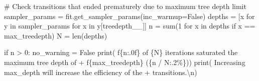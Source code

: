 \documentclass[
  letterpaper,
  DIV=11,
  numbers=noendperiod]{scrartcl}
\newenvironment{Shaded}{\begin{snugshade}}{\end{snugshade}}
\newcommand{\BuiltInTok}[1]{\textcolor[rgb]{0.00,0.23,0.31}{#1}}
\newcommand{\CharTok}[1]{\textcolor[rgb]{0.13,0.47,0.30}{#1}}
\newcommand{\CommentTok}[1]{\textcolor[rgb]{0.37,0.37,0.37}{#1}}
\newcommand{\ControlFlowTok}[1]{\textcolor[rgb]{0.00,0.23,0.31}{#1}}
\newcommand{\DecValTok}[1]{\textcolor[rgb]{0.68,0.00,0.00}{#1}}
\newcommand{\KeywordTok}[1]{\textcolor[rgb]{0.00,0.23,0.31}{#1}}
\newcommand{\NormalTok}[1]{\textcolor[rgb]{0.00,0.23,0.31}{#1}}
\newcommand{\OperatorTok}[1]{\textcolor[rgb]{0.37,0.37,0.37}{#1}}
\newcommand{\SpecialCharTok}[1]{\textcolor[rgb]{0.37,0.37,0.37}{#1}}
\newcommand{\SpecialStringTok}[1]{\textcolor[rgb]{0.13,0.47,0.30}{#1}}
\newcommand{\StringTok}[1]{\textcolor[rgb]{0.13,0.47,0.30}{#1}}
\newcommand{\VariableTok}[1]{\textcolor[rgb]{0.07,0.07,0.07}{#1}}
\begin{document}
\begin{Shaded}
\begin{Highlighting}[]
  \CommentTok{\# Check transitions that ended prematurely due to maximum tree depth limit}
\NormalTok{  sampler\_params }\OperatorTok{=}\NormalTok{ fit.get\_sampler\_params(inc\_warmup}\OperatorTok{=}\VariableTok{False}\NormalTok{)}
\NormalTok{  depths }\OperatorTok{=}\NormalTok{ [x }\ControlFlowTok{for}\NormalTok{ y }\KeywordTok{in}\NormalTok{ sampler\_params }\ControlFlowTok{for}\NormalTok{ x }\KeywordTok{in}\NormalTok{ y[}\StringTok{\textquotesingle{}treedepth\_\_\textquotesingle{}}\NormalTok{]]}
\NormalTok{  n }\OperatorTok{=} \BuiltInTok{sum}\NormalTok{(}\DecValTok{1} \ControlFlowTok{for}\NormalTok{ x }\KeywordTok{in}\NormalTok{ depths }\ControlFlowTok{if}\NormalTok{ x }\OperatorTok{==}\NormalTok{ max\_treedepth)}
\NormalTok{  N }\OperatorTok{=} \BuiltInTok{len}\NormalTok{(depths)}
  
  \ControlFlowTok{if}\NormalTok{ n }\OperatorTok{\textgreater{}} \DecValTok{0}\NormalTok{:}
\NormalTok{    no\_warning }\OperatorTok{=} \VariableTok{False}
    \BuiltInTok{print}\NormalTok{(  }\SpecialStringTok{f\textquotesingle{}}\SpecialCharTok{\{}\NormalTok{n}\SpecialCharTok{:.0f\}}\SpecialStringTok{ of }\SpecialCharTok{\{}\NormalTok{N}\SpecialCharTok{\}}\SpecialStringTok{ iterations saturated the maximum tree depth of \textquotesingle{}}
          \OperatorTok{+} \SpecialStringTok{f\textquotesingle{}}\SpecialCharTok{\{}\NormalTok{max\_treedepth}\SpecialCharTok{\}}\SpecialStringTok{ (}\SpecialCharTok{\{}\NormalTok{n }\OperatorTok{/}\NormalTok{ N}\SpecialCharTok{:.2\%\}}\SpecialStringTok{)\textquotesingle{}}\NormalTok{)}
    \BuiltInTok{print}\NormalTok{(  }\StringTok{\textquotesingle{}  Increasing max\_depth will increase the efficiency of the \textquotesingle{}}
          \OperatorTok{+} \StringTok{\textquotesingle{}transitions.}\CharTok{\textbackslash{}n}\StringTok{\textquotesingle{}}\NormalTok{)}
  

\end{Highlighting}
\end{Shaded}
\end{document}
